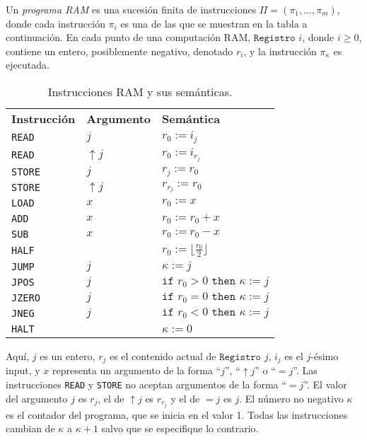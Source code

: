 \documentclass[twoside]{article}
\begin{document}
\begin{defi}
Un \emph{programa RAM} es una sucesión finita de instrucciones $\Pi=(\pi_1,\dots,\pi_m)$, donde cada instrucción $\pi_i$ es una de las que se muestran en la tabla a continuación. En cada punto de una computación RAM, $\texttt{Registro }i$, donde $i\geq 0$, contiene un entero, posiblemente negativo, denotado $r_i$, y la instrucción $\pi_\kappa$ es ejecutada.

\begin{table}[h!]
\begin{tabular}{l l l}
\textbf{Instrucción} & \textbf{Argumento} & \textbf{Semántica}\\
\texttt{READ}        & $j$               & $r_0:=i_j$\\
\texttt{READ}        & $\uparrow j$      & $r_0:=i_{r_j}$\\
\texttt{STORE}       & $j$               & $r_j:=r_0$\\
\texttt{STORE}       & $\uparrow j$      & $r_{r_j}:=r_0$\\
\texttt{LOAD}        & $x$               & $r_0:=x$\\
\texttt{ADD}         & $x$               & $r_0:=r_0+x$\\
\texttt{SUB}         & $x$               & $r_0:=r_0-x$\\
\texttt{HALF}        &                   & $r_0:=\lfloor\frac{r_0}{2}\rfloor$\\
\texttt{JUMP}        & $j$               & $\kappa:=j$\\
\texttt{JPOS}        & $j$               & $\texttt{if }r_0>0\texttt{ then }\kappa:=j$\\
\texttt{JZERO}       & $j$               & $\texttt{if }r_0=0\texttt{ then }\kappa:=j$\\
\texttt{JNEG}        & $j$               & $\texttt{if }r_0<0\texttt{ then }\kappa:=j$\\
\texttt{HALT}        &                   & $\kappa:=0$\\
\end{tabular}
\caption{Instrucciones RAM y sus semánticas.}\label{instrucciones}
\end{table}
Aquí, $j$ es un entero, $r_j$ es el contenido actual de $\texttt{Registro }j$, $i_j$ es el $j$-ésimo input, y $x$ representa un argumento de la forma ``$j$'', ``$\uparrow j$'' o ``$=j$''. Las instrucciones \texttt{READ} y \texttt{STORE} no aceptan argumentos de la forma ``$=j$''. El valor del argumento $j$ es $r_j$, el de $\uparrow j$ es $r_{r_j}$ y el de $=j$ es $j$. El número no negativo $\kappa$ es el contador del programa, que se inicia en el valor 1. Todas las instrucciones cambian de $\kappa$ a $\kappa+1$ salvo que se especifique lo contrario.
\end{defi}
\end{document}
